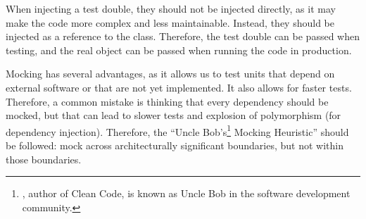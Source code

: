 When injecting a test double, they should not be injected directly, as it may make the code more complex and less maintainable. Instead, they should be injected as a reference to the class. Therefore, the test double can be passed when testing, and the real object can be passed when running the code in production.

Mocking has several advantages, as it allows us to test units that depend on external software or that are not yet implemented. It also allows for faster tests. Therefore, a common mistake is thinking that every dependency should be mocked, but that can lead to slower tests and explosion of polymorphism (for dependency injection). Therefore, the ``Uncle Bob's\footnote{, author of Clean Code, is known as Uncle Bob in the software development community.} Mocking Heuristic'' should be followed: mock across architecturally significant boundaries, but not within those boundaries.
